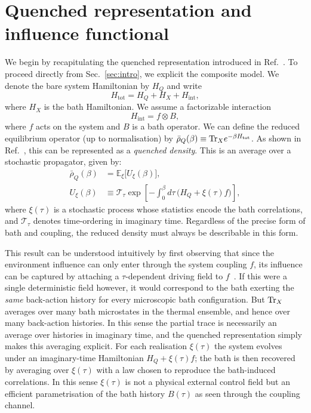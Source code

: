 \section{Quenched representation and influence functional\label{sec:quenched}\label{sec:model}}
We begin by recapitulating the quenched representation introduced in Ref.~\cite{mccaulMeanForceHamiltoniansInfluence2026}.
To proceed directly from Sec.~\ref{sec:intro}, we explicit the composite model.
We denote the bare system Hamiltonian by $H_Q$ and write
\begin{equation}
    H_{\mathrm{tot}} = H_Q + H_X + H_{\mathrm{int}},
    \label{eq:Htot_split_sec3}
\end{equation}
where $H_X$ is the bath Hamiltonian. We assume a factorizable interaction
\begin{equation}
    H_{\mathrm{int}} = f \otimes B,
    \label{eq:Hint_general_f_B}
\end{equation}
where $f$ acts on the system and $B$ is a bath operator. We can define the reduced equilibrium operator (up to normalisation) by $\bar{\rho}_Q(\beta)\equiv \mathrm{Tr}_X e^{-\beta H_{\mathrm{tot}}}$. As shown in Ref.~\cite{mccaulMeanForceHamiltoniansInfluence2026}, this can be represented as a \emph{quenched density}. This is an average over a stochastic propagator, given by:
\begin{align}
    \bar{\rho}_Q(\beta) &= \mathbb E_\xi\big[U_\xi(\beta)\big],
    \label{eq:quenched_identity_main}\\
    U_\xi(\beta) &\equiv \mathcal T_\tau \exp\!\left[-\int_0^\beta d\tau\,\big(H_Q+\xi(\tau)f\big)\right],
    \label{eq:quenched_propagator_sec3}
\end{align}
where $\xi(\tau)$ is a stochastic process whose statistics encode the bath correlations, and $ \mathcal T_\tau$ denotes time-ordering in imaginary time. Regardless of the precise form of bath and coupling, the reduced density must always be describable in this form. 

This result can be understood intuitively by first observing that since the environment influence can only enter through the system coupling $f$, its influence can be captured by attaching a $\tau$-dependent driving field to $f$~\cite{huQuantumBrownianMotion1992,mccaulHowWinFriends2021b}. If this were a single deterministic field however, it would correspond to the bath exerting the \emph{same} back-action history for every microscopic bath configuration. But $\mathrm{Tr}_X$ averages over many bath microstates in the thermal ensemble, and hence over many back-action histories. In this sense the partial trace is necessarily an average over histories in imaginary time, and the quenched representation simply makes this averaging explicit. For each realisation $\xi(\tau)$ the system evolves under an imaginary-time Hamiltonian $H_Q+\xi(\tau)f$; the bath is then recovered by averaging over $\xi(\tau)$ with a law chosen to reproduce the bath-induced correlations. In this sense $\xi(\tau)$ is not a physical external control field but an efficient parametrisation of the bath history $B(\tau)$ as seen through the coupling channel. 

